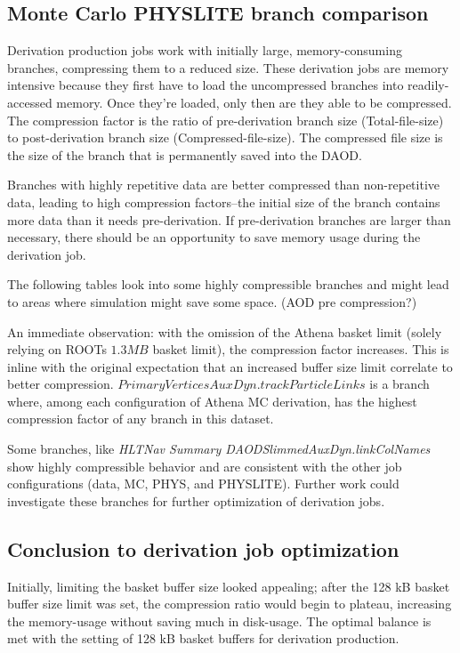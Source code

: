 \subsection{Monte Carlo PHYSLITE branch comparison}
\label{sec:DAODProd_Results_Monte}

Derivation production jobs work with initially large, memory-consuming branches, compressing them to a reduced size. 
These derivation jobs are memory intensive because they first have to load the uncompressed branches into readily-accessed memory. 
Once they're loaded, only then are they able to be compressed. 
The compression factor is the ratio of pre-derivation branch size (Total-file-size) to post-derivation branch size (Compressed-file-size). 
The compressed file size is the size of the branch that is permanently saved into the DAOD.  

Branches with highly repetitive data are better compressed than non-repetitive data, leading to high compression factors--the initial size of the branch contains more data than it needs pre-derivation. 
If pre-derivation branches are larger than necessary, there should be an opportunity to save memory usage during the derivation job. 

The following tables look into some highly compressible branches and might lead to areas where simulation might save some space. (AOD pre compression?)





An immediate observation: with the omission of the Athena basket limit (solely relying on ROOTs $1.3 MB$ basket limit), the compression factor increases. 
This is inline with the original expectation that an increased buffer size limit correlate to better compression. 
$\textit{PrimaryVerticesAuxDyn.trackParticleLinks}$ is a branch where, among each configuration of Athena MC derivation, has the highest compression factor of any branch in this dataset. 

Some branches, like \textit{HLTNav Summary DAODSlimmedAuxDyn.linkColNames} show highly compressible behavior and are consistent with the other job configurations (data, MC, PHYS, and PHYSLITE). 
Further work could investigate these branches for further optimization of derivation jobs.

\subsection{Conclusion to derivation job optimization}
\label{sec:DAODProd_Results_conclusion}
Initially, limiting the basket buffer size looked appealing; after the 128 kB basket buffer size limit was set, the compression ratio would begin to plateau, increasing the memory-usage without saving much in disk-usage. 
The optimal balance is met with the setting of 128 kB basket buffers for derivation production. 


